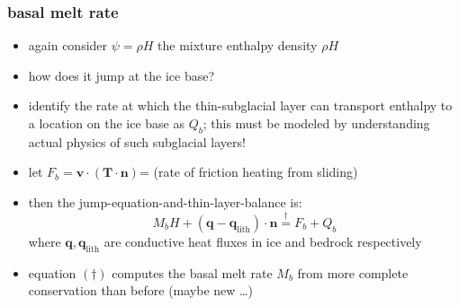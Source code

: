 \documentclass{beamer}
\newcommand{\bn}{\mathbf{n}}
\newcommand{\bq}{\mathbf{q}}
\newcommand{\bv}{\mathbf{v}}
\begin{document}
\begin{frame}
  \frametitle{basal melt rate}

\begin{itemize}
\item again consider $\psi=\rho H$ the mixture enthalpy density $\rho H$
\item how does it jump at the ice base?
\item identify the rate at which the thin-subglacial layer can transport enthalpy to a location on the ice base as $Q_b$; this must be modeled by understanding actual physics of such subglacial layers!
\item let $F_b = \bv \cdot (\mathbf{T}\cdot \mathbf{n})$= (rate of friction heating from sliding)
\item then the jump-equation-and-thin-layer-balance is:
\begin{equation*}
M_b H + \left(\bq - \bq_{\text{lith}}\right)\cdot \bn \stackrel{\dagger}{=} F_b + Q_b
\end{equation*}
where $\bq,\bq_{\text{lith}}$ are conductive heat fluxes in ice and bedrock respectively
\item equation $(\dagger)$ \alert{computes the basal melt rate} $M_b$ from more complete conservation than before (maybe new \dots)
\end{itemize}
\end{frame}
\end{document}
